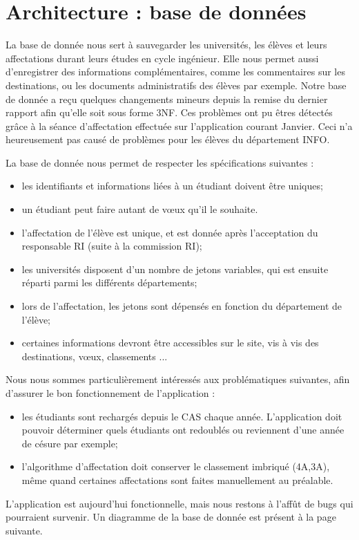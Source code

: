 \chapter{Architecture : base de données}

La base de donnée nous sert à sauvegarder les universités, les élèves et leurs affectations durant leurs études en cycle ingénieur. Elle nous permet aussi d'enregistrer des informations complémentaires, comme les commentaires sur les destinations, ou les documents administratifs des élèves par exemple.
\bigbreak
Notre base de donnée a reçu quelques changements mineurs depuis la remise du dernier rapport afin qu'elle soit sous forme 3NF. Ces problèmes ont pu êtres détectés grâce à la séance d'affectation effectuée sur l'application courant Janvier. Ceci n'a heureusement pas causé de problèmes pour les élèves du département INFO.

La base de donnée nous permet de respecter les spécifications suivantes :
\bigbreak
\begin{itemize}
	\item les identifiants et informations liées à un étudiant doivent être uniques;
	\item un étudiant peut faire autant de vœux qu'il le souhaite.
	\item l'affectation de l'élève est unique, et est donnée après l'acceptation du responsable RI (suite à la commission RI);
	\item les universités disposent d'un nombre de jetons variables, qui est ensuite réparti parmi les différents départements;
	\item lors de l'affectation, les jetons sont dépensés en fonction du département de l'élève;
	\item certaines informations devront être accessibles sur le site, vis à vis des destinations, vœux, classements ...
\end{itemize}
\bigbreak
Nous nous sommes particulièrement intéressés aux problématiques suivantes, afin d'assurer le bon fonctionnement de l'application :
\bigbreak
\begin{itemize}
	\item les étudiants sont rechargés depuis le CAS chaque année. L'application doit pouvoir déterminer quels étudiants ont redoublés ou reviennent d'une année de césure par exemple;
	\item l'algorithme d'affectation doit conserver le classement imbriqué (4A,3A), même quand certaines affectations sont faites manuellement au préalable.
\end{itemize}
\bigbreak
L'application est aujourd'hui fonctionnelle, mais nous restons à l'affût de bugs qui pourraient survenir. Un diagramme de la base de donnée est présent à la page suivante.

